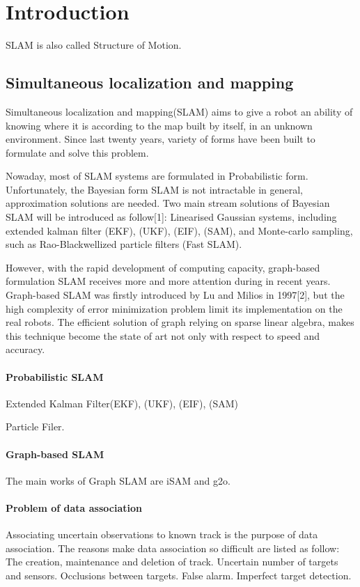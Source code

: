 \chapter{Introduction}
\label{cha:intro}
SLAM is also called Structure of Motion.

\section{Simultaneous localization and mapping}
Simultaneous localization and mapping(SLAM) aims to give a robot an ability of knowing where it is according to the map built by itself, in an unknown environment. Since last twenty years, variety of forms have been built to formulate and solve this problem.

Nowaday, most of SLAM systems are formulated in Probabilistic form. Unfortunately, the Bayesian form SLAM is not intractable in general, approximation solutions are needed. Two main stream solutions of Bayesian SLAM will be introduced as follow[1]: Linearised Gaussian systems, including extended kalman filter (EKF), (UKF), (EIF), (SAM), and Monte-carlo sampling, such as Rao-Blackwellized particle filters (Fast SLAM). 

However, with the rapid development of computing capacity, graph-based formulation SLAM receives more and more attention during in recent years. Graph-based SLAM was firstly introduced by Lu and Milios in 1997[2], but the high complexity of error minimization problem limit its implementation on the real robots. The efficient solution of graph relying on sparse linear algebra, makes this technique become the  state of art not only with respect to speed and accuracy.



\subsubsection{Probabilistic SLAM}
Extended Kalman Filter(EKF), (UKF), (EIF), (SAM) 

Particle Filer.
 
\subsubsection{Graph-based SLAM}
The main works of Graph SLAM are iSAM and g2o.

\subsubsection{Problem of data association}
Associating uncertain observations to known track is the purpose of data association. The reasons make data association so difficult are listed as follow:
	The creation, maintenance and deletion of track.
	Uncertain number of targets and sensors.
	Occlusions between targets.
	False alarm.
	Imperfect target detection.

